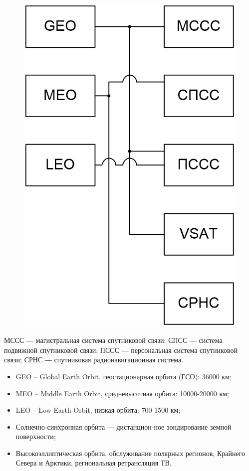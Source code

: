 \documentclass[14pt,a4paper,oneside]{extarticle}
\begin{document}
\begin{figure}[H]
    \begin{center}
        \includegraphics[width=\textwidth/2]{imgs/2}
    \end{center}
\end{figure}

МССС ― магистральная система спутниковой связи; СПСС ―
система подвижной спутниковой связи; ПССС ― персональная система спутниковой связи; СРНС ― спутниковая радионавигационная система. 

\begin{itemize}
    \item GEO – Global Earth Orbit, геостационарная орбита (ГСО): 36000 км;
    \item MEO – Middle Earth Orbit, средневысотная орбита: 10000-20000 км;
    \item LEO – Low Earth Orbit, низкая орбита: 700-1500 км;
    \item Солнечно-синхронная орбита ― дистанцион-ное зондирование земной поверхности;
    \item Высокоэллиптическая орбита, обслуживание полярных регионов, Крайнего Севера и Арктики, региональная ретрансляция ТВ.
\end{itemize}
\end{document}
